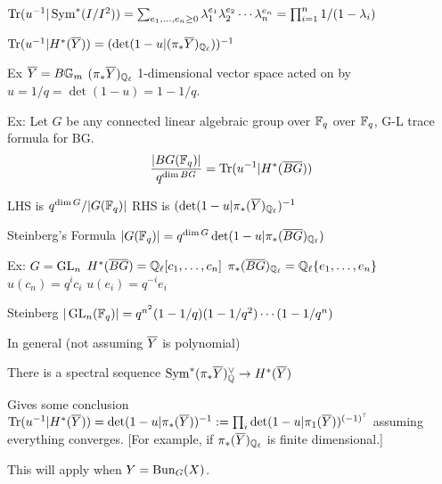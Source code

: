 $\operatorname{Tr}(u^{-1}|\operatorname{Sym}^*(I/I^2))= \sum_{e_1,\ldots,e_n \geq 0} \lambda_1^{e_1} \lambda_2^{e_2} \cdots \lambda_n^{e_n}= \prod_{i=1}^n 1/(1-\lambda_i)$

$\operatorname{Tr}(u^{-1}| H^*(\overline{Y}))= (\det(1-u | (\pi_* \overline{Y})_{\mathbb{Q}_\ell}))^{-1}$

Ex $\overline{Y}= B\mathbb{G}_m$
$(\pi_* \overline{Y})_{\mathbb{Q}_\ell}$ 1-dimensional vector space
acted on by $u= 1/q= \det(1-u)= 1-1/q$.


Ex: Let $G$ be any connected linear algebraic group over $\mathbb{F}_q$ over $\mathbb{F}_q$, G-L trace formula for BG.
	\[
	\dfrac{|BG(\mathbb{F}_q)|}{q^{\dim BG}} = \operatorname{Tr}(u^{-1} | H^*(\overline{BG}))
	\]

LHS is $q^{\dim G}/|G(\mathbb{F}_q)|$
RHS is $(\det (1-u | \pi_*(\overline{Y})_{\mathbb{Q}_\ell})^{-1}$

Steinberg's Formula 
$|G(\mathbb{F}_q)|= q^{\dim G} \det(1-u | \pi_*(\overline{BG})_{\mathbb{Q}_\ell})$


Ex: $G= \operatorname{GL}_n$
$H^*(\overline{BG})= \mathbb{Q}_\ell[c_1,\ldots,c_n]$
$\pi_*(\overline{BG})_{\mathbb{Q}_\ell}= \mathbb{Q}_\ell\{e_1,\ldots,e_n\}$
$u(c_n)= q^i c_i$
$u(e_i)= q^{-i} e_i$

Steinberg
$|\operatorname{GL}_n(\mathbb{F}_q)|= q^{n^2} (1-1/q)(1-1/q^2)\cdots(1-1/q^n)$


In general (not assuming $\overline{Y}$ is polynomial)

There is a spectral sequence $\operatorname{Sym}^*(\pi_* \overline{Y})_{\mathbb{Q}}^\vee \to H^*(\overline{Y})$

Gives some conclusion
$\operatorname{Tr}(u^{-1}|H^*(\overline{Y}))= \det(1-u| \pi_*(\overline{Y}))^{-1}:= \prod_i \det(1-u | \pi_1(\overline{Y}))^{(-1)^?}$ assuming everything converges. [For example, if $\pi_*(\overline{Y})_{\mathbb{Q}_\ell}$ is finite dimensional.] 




This will apply when $Y= \operatorname{Bun}_G(X)$. 




















